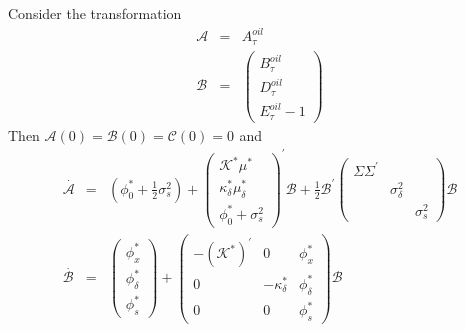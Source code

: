 \documentclass{article}
\begin{document}
Consider the transformation%
\begin{eqnarray*}
\mathcal{A} &=&A_{\tau }^{oil} \\
\mathcal{B} &=&\left( 
\begin{array}{c}
B_{\tau }^{oil} \\ 
D_{\tau }^{oil} \\ 
E_{\tau }^{oil}-1%
\end{array}%
\right)
\end{eqnarray*}%
Then $\mathcal{A}\left( 0\right) =\mathcal{B}\left( 0\right) =\mathcal{C}%
\left( 0\right) =0\,\ $and%
\begin{eqnarray*}
\overset{\cdot }{\mathcal{A}} &=&\left( \phi _{0}^{\ast }+\frac{1}{2}\sigma
_{s}^{2}\right) +\left( 
\begin{array}{c}
\mathcal{K}^{\ast }\mu ^{\ast } \\ 
\kappa _{\delta }^{\ast }\mu _{\delta }^{\ast } \\ 
\phi _{0}^{\ast }+\sigma _{s}^{2}%
\end{array}%
\right) ^{\prime }\mathcal{B}+\frac{1}{2}\mathcal{B}^{\prime }%
\begin{pmatrix}
\Sigma \Sigma ^{\prime } &  &  \\ 
& \sigma _{\delta }^{2} &  \\ 
&  & \sigma _{s}^{2}%
\end{pmatrix}%
\mathcal{B} \\
\overset{\cdot }{\mathcal{B}} &=&\left( 
\begin{array}{c}
\phi _{x}^{\ast } \\ 
\phi _{\delta }^{\ast } \\ 
\phi _{s}^{\ast }%
\end{array}%
\right) +%
\begin{pmatrix}
-\left( \mathcal{K}^{\ast }\right) ^{\prime } & 0 & \phi _{x}^{\ast } \\ 
0 & -\kappa _{\delta }^{\ast } & \phi _{\delta }^{\ast } \\ 
0 & 0 & \phi _{s}^{\ast }%
\end{pmatrix}%
\mathcal{B}
\end{eqnarray*}
\end{document}
